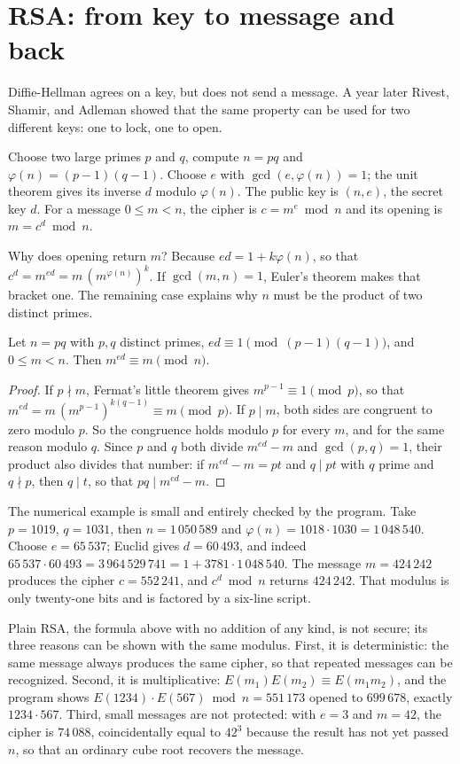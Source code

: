 \section{RSA: from key to message and back}

Diffie-Hellman agrees on a key, but does not send a message. A year later Rivest, Shamir, and
Adleman showed that the same property can be used for two different keys: one to lock, one to open.

Choose two large primes $p$ and $q$, compute $n=pq$ and $\varphi(n)=(p-1)(q-1)$. Choose $e$ with
$\gcd(e,\varphi(n))=1$; the unit theorem gives its inverse $d$ modulo $\varphi(n)$. The public key is
$(n,e)$, the secret key $d$. For a message $0\le m<n$, the cipher is $c=m^e\bmod n$ and its opening is
$m=c^d\bmod n$.

Why does opening return $m$? Because $ed=1+k\varphi(n)$, so that
$c^d=m^{ed}=m\,(m^{\varphi(n)})^k$. If $\gcd(m,n)=1$, Euler's theorem makes that bracket one. The
remaining case explains why $n$ must be the product of two distinct primes.

\begin{teorema}
Let $n=pq$ with $p,q$ distinct primes, $ed\equiv1\pmod{(p-1)(q-1)}$, and $0\le m<n$. Then
$m^{ed}\equiv m\pmod n$.
\end{teorema}

\begin{proof}
If $p\nmid m$, Fermat's little theorem gives $m^{p-1}\equiv1\pmod p$, so that
$m^{ed}=m\,(m^{p-1})^{k(q-1)}\equiv m\pmod p$. If $p\mid m$, both sides are congruent to zero modulo
$p$. So the congruence holds modulo $p$ for every $m$, and for the same reason modulo $q$. Since $p$
and $q$ both divide $m^{ed}-m$ and $\gcd(p,q)=1$, their product also divides that number: if
$m^{ed}-m=pt$ and $q\mid pt$ with $q$ prime and $q\nmid p$, then $q\mid t$, so that $pq\mid m^{ed}-m$.
\end{proof}

The numerical example is small and entirely checked by the program. Take $p=1019$, $q=1031$, then
$n=1\,050\,589$ and $\varphi(n)=1018\cdot1030=1\,048\,540$. Choose $e=65\,537$; Euclid gives
$d=60\,493$, and indeed $65\,537\cdot60\,493=3\,964\,529\,741=1+3781\cdot1\,048\,540$. The message
$m=424\,242$ produces the cipher $c=552\,241$, and $c^d\bmod n$ returns $424\,242$. That modulus is
only twenty-one bits and is factored by a six-line script.

Plain RSA, the formula above with no addition of any kind, is not secure; its three reasons can be
shown with the same modulus. First, it is deterministic: the same message always produces the same
cipher, so that repeated messages can be recognized. Second, it is multiplicative:
$E(m_1)E(m_2)\equiv E(m_1m_2)$, and the program shows
$E(1234)\cdot E(567)\bmod n=551\,173$ opened to $699\,678$, exactly $1234\cdot567$. Third, small
messages are not protected: with $e=3$ and $m=42$, the cipher is $74\,088$, coincidentally equal to
$42^3$ because the result has not yet passed $n$, so that an ordinary cube root recovers the message.

